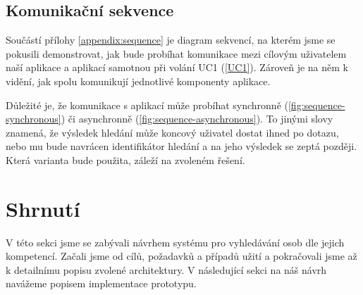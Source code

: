 \subsection{Komunikační sekvence}
Součástí přílohy \ref{appendix:sequence} je diagram sekvencí, na kterém jsme se pokusili demonstrovat, jak bude probíhat komunikace mezi cílovým uživatelem naší aplikace a aplikací samotnou při volání UC1 (\ref{UC1}).
Zároveň je na něm k vidění, jak spolu komunikují jednotlivé komponenty aplikace.\par
Důležité je, že komunikace s aplikací může probíhat synchronně (\ref{fig:sequence-synchronous}) či asynchronně (\ref{fig:sequence-asynchronous}). To jinými slovy znamená, že výsledek hledání může koncový uživatel dostat ihned po dotazu, nebo mu bude navrácen identifikátor hledání a na jeho výsledek se zeptá později. Která varianta bude použita, záleží na zvoleném řešení.\par
\section{Shrnutí}
V této sekci jsme se zabývali návrhem systému pro vyhledávání osob dle jejich kompetencí. Začali jsme od cílů, požadavků a případů užití a pokračovali jsme až k detailnímu popisu zvolené architektury. V následující sekci na náš návrh navážeme popisem implementace prototypu.







